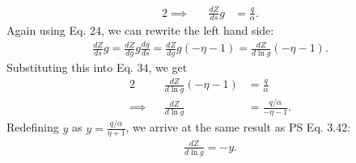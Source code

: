 \documentclass[11pt,letterpaper]{article}
\begin{document}
\begin{enumerate}[label=(\roman*)]
\begin{alignat}{2}
        \implies&&\frac{dZ}{ds}g &= \frac{q}{\alpha}.
    \end{alignat}
    Again using Eq. 24, we can rewrite the left hand side:
    \begin{align}
        \frac{dZ}{ds}g = \frac{dZ}{dg}g\frac{dg}{ds} = \frac{dZ}{dg}g(-\eta-1) = \frac{dZ}{d\ln{g}}(-\eta-1).
    \end{align}
    Substituting this into Eq. 34, we get 
    \begin{alignat}{2}
        &&\frac{dZ}{d\ln{g}}(-\eta-1) &= \frac{q}{\alpha} \\
        \implies&&\frac{dZ}{d\ln{g}} &= \frac{q/\alpha}{-\eta-1}.
    \end{alignat}
    Redefining $y$ as $y = \frac{q/\alpha}{\eta+1}$, we arrive at the same result as PS Eq. 3.42:
    \begin{align}
        \frac{dZ}{d\ln{g}} = -y.
    \end{align}


\end{enumerate}
\end{document}
